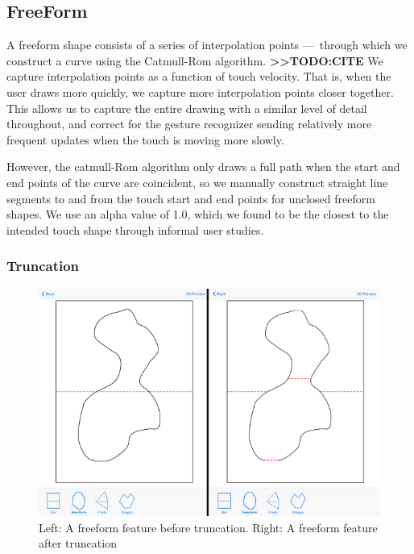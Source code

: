 \subsection{FreeForm}\label{freeform}

A freeform shape consists of a series of interpolation points
---~through which we construct a curve using the Catmull-Rom algorithm.
\textbf{\textgreater{}\textgreater{}TODO:CITE} We capture interpolation
points as a function of touch velocity. That is, when the user draws
more quickly, we capture more interpolation points closer together. This
allows us to capture the entire drawing with a similar level of detail
throughout, and correct for the gesture recognizer sending relatively
more frequent updates when the touch is moving more slowly.

However, the catmull-Rom algorithm only draws a full path when the start
and end points of the curve are coincident, so we manually construct
straight line segments to and from the touch start and end points for
unclosed freeform shapes. We use an alpha value of 1.0, which we found
to be the closest to the intended touch shape through informal user
studies.

\subsubsection{Truncation}\label{truncation}

\begin{figure}[htbp]
\centering
\includegraphics{figures/41_Tech_Tool_Implementation/truncationBeforeAfter.pdf}
\caption{Left: A freeform feature before truncation. Right: A freeform
feature after truncation}
\end{figure}


